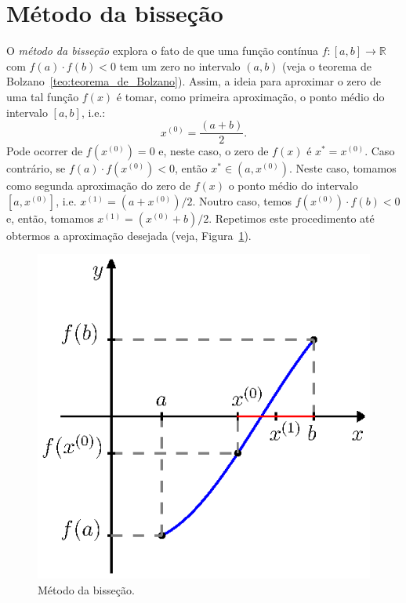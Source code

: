 \section{Método da bisseção}

O \emph{método da bisseção} explora o fato de que uma função contínua $f:[a, b]\to \mathbb{R}$ com $f(a)\cdot f(b) < 0$ tem um zero no intervalo $(a, b)$ (veja o teorema de Bolzano~\ref{teo:teorema_de_Bolzano}). Assim, a ideia para aproximar o zero de uma tal função $f(x)$ é tomar, como primeira aproximação, o ponto médio do intervalo $[a, b]$, i.e.:
\begin{equation*}
  x^{(0)} = \frac{(a + b)}{2}. 
\end{equation*}
Pode ocorrer de $f(x^{(0)}) = 0$ e, neste caso, o zero de $f(x)$ é $x^* = x^{(0)}$. Caso contrário, se $f(a)\cdot f(x^{(0)}) < 0$, então $x^*\in (a, x^{(0)})$. Neste caso, tomamos como segunda aproximação do zero de $f(x)$ o ponto médio do intervalo $[a, x^{(0)}]$, i.e. $x^{(1)} = (a + x^{(0)})/2$. Noutro caso, temos $f(x^{(0)})\cdot f(b) < 0$ e, então, tomamos $x^{(1)} = (x^{(0)} + b)/2$. Repetimos este procedimento até obtermos a aproximação desejada (veja, Figura~\ref{fig:metodo_da_bissecao}).
 
\begin{figure}
  \centering
  \includegraphics{./cap_equacao1d/pics/metodo_da_bissecao/metodo_da_bissecao.eps}
  \caption{Método da bisseção.}
  \label{fig:metodo_da_bissecao}
\end{figure}

